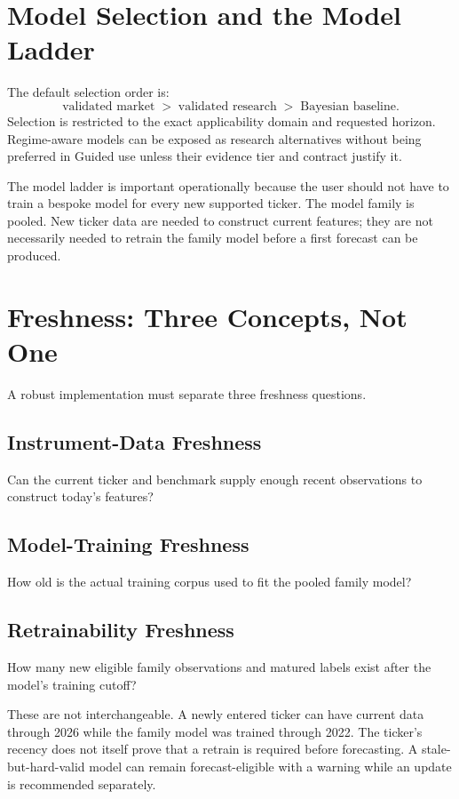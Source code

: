 \documentclass[11pt]{article}
\begin{document}
\section{Model Selection and the Model Ladder}
The default selection order is:
\begin{equation}
\text{validated market}\;>\;\text{validated research}\;>\;\text{Bayesian baseline}.
\end{equation}
Selection is restricted to the exact applicability domain and requested horizon. Regime-aware models can be exposed as research alternatives without being preferred in Guided use unless their evidence tier and contract justify it.

The model ladder is important operationally because the user should not have to train a bespoke model for every new supported ticker. The model family is pooled. New ticker data are needed to construct current features; they are not necessarily needed to retrain the family model before a first forecast can be produced.

\section{Freshness: Three Concepts, Not One}
A robust implementation must separate three freshness questions.

\subsection{Instrument-Data Freshness}
Can the current ticker and benchmark supply enough recent observations to construct today's features?

\subsection{Model-Training Freshness}
How old is the actual training corpus used to fit the pooled family model?

\subsection{Retrainability Freshness}
How many new eligible family observations and matured labels exist after the model's training cutoff?

These are not interchangeable. A newly entered ticker can have current data through 2026 while the family model was trained through 2022. The ticker's recency does not itself prove that a retrain is required before forecasting. A stale-but-hard-valid model can remain forecast-eligible with a warning while an update is recommended separately.
\end{document}
